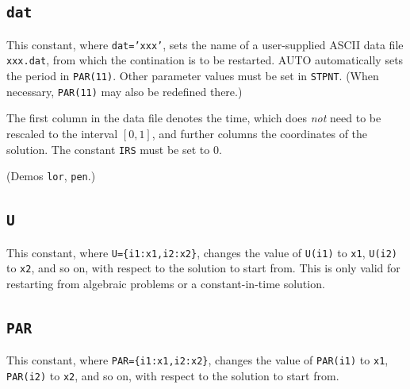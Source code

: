 \documentclass[12pt]{report}
\begin{document}
\subsection{\tt dat}  \label{sec:dat}
This constant, where {\tt dat='xxx'}, sets the name of a user-supplied ASCII
data file {\tt xxx.dat}, from which the contination is to be restarted.
{\cal AUTO} automatically sets the period in {\tt PAR(11)}.
Other parameter values must be set in {\tt STPNT}. (When necessary,
{\tt PAR(11)} may also be redefined there.) 

The first column in the data file denotes the time, which does
\emph{not} need to be rescaled to the interval $[0,1]$, and further
columns the coordinates of the solution. The constant {\tt IRS} must
be set to 0.

(Demos {\tt lor}, {\tt pen}.)

\subsection{\tt U}  \label{sec:U}
This constant, where {\tt U=\{i1:x1,i2:x2\}}, changes the value of
{\tt U(i1)} to {\tt x1}, {\tt U(i2)} to {\tt x2}, and so on,
with respect to the solution to start from. This is only
valid for restarting from algebraic problems or a constant-in-time
solution.

\subsection{\tt PAR}  \label{sec:PAR}
This constant, where {\tt PAR=\{i1:x1,i2:x2\}}, changes the value of
{\tt PAR(i1)}  to {\tt x1}, {\tt PAR(i2)} to
{\tt x2}, and so on, with respect to the solution to start from.
\end{document}
